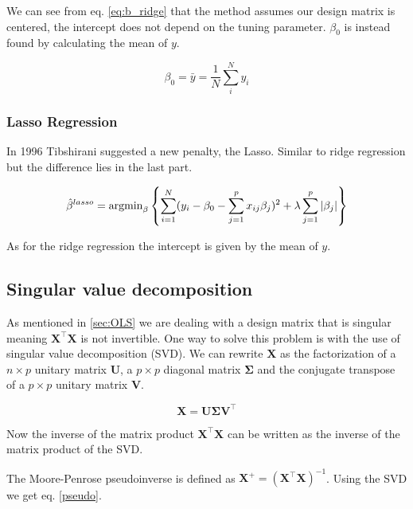 \documentclass[a4paper,12pt, english]{article}
\begin{document}
We can see from eq. \ref{eq:b_ridge} that the method assumes our design matrix is centered, the intercept does not depend on the tuning parameter. $\beta_0$ is instead found by calculating the mean of $y$.

\begin{equation} \label{y_mean}
\beta_0 = \bar{y} = \frac{1}{N} \sum_i^N y_i
\end{equation}

\subsubsection{Lasso Regression}

In 1996 Tibshirani suggested a new penalty, the Lasso. Similar to ridge regression but the difference lies in the last part.  

\begin{equation}
\hat{\beta}^{lasso} = \textnormal{argmin}_{\beta} \left \{ \sum_{i=1}^{N} (y_i - \beta_0 - \sum_{j=1}^{p} x_{ij} \beta_j)^2 + \lambda \sum_{j=1}^{p} |\beta_j| \right \}
\end{equation}

As for the ridge regression the intercept is given by the mean of $y$.

\subsection{Singular value decomposition}

As mentioned in \ref{sec:OLS} we are dealing with a design matrix that is singular meaning $\mathbf{X}^{\top}\mathbf{X}$ is not invertible. One way to solve this problem is with the use of singular value decomposition (SVD). We can rewrite $\mathbf{X}$ as the factorization of a $n \times p$ unitary matrix $\mathbf{U}$, a $p \times p$ diagonal matrix $\mathbf{\Sigma}$ and the conjugate transpose of a $p \times p$ unitary matrix $\mathbf{V}$.

\begin{equation} \label{eq:SVD}
\mathbf{X} = \mathbf{U} \mathbf{\Sigma} \mathbf{V}^\top
\end{equation}

Now the inverse of the matrix product $\mathbf{X}^{\top}\mathbf{X}$ can be written as the inverse of the matrix product of the SVD.

The Moore-Penrose pseudoinverse is defined as $\mathbf{X}^+ = (\mathbf{X}^{\top}\mathbf{X})^{-1}$. Using the SVD we get eq. \ref{pseudo}.
\end{document}
